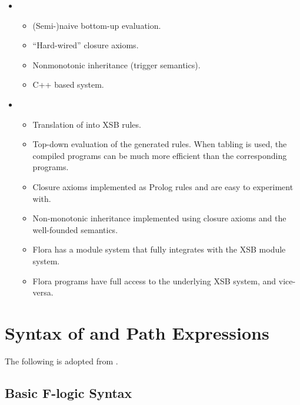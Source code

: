 \documentclass[11pt]{report}
\begin{document}
\begin{itemize}
\item \FLORID
  \begin{itemize}
  \item (Semi-)naive bottom-up evaluation.
  \item ``Hard-wired'' closure axioms.
  \item Nonmonotonic inheritance (trigger semantics).
  \item C++ based system.
  \end{itemize}
\item \FLORA
  \begin{itemize}
  \item Translation of \fl into XSB rules.
  \item Top-down evaluation of the generated rules. When tabling is used,
    the compiled programs can be much more efficient than the corresponding
    \FLORID programs.
  \item Closure axioms implemented as Prolog rules and are easy to
    experiment with.
  \item Non-monotonic inheritance implemented using closure axioms and the
    well-founded semantics.
  \item Flora has a module system that fully integrates with the XSB module
    system.
  \item Flora programs have full access to the underlying XSB system, and
    vice-versa.
  \end{itemize}
\end{itemize}



\section{Syntax of \FLORA and Path Expressions }

The following is adopted from \cite{ludaescher-himmeroeder-IS-98}.


\subsection{Basic F-logic Syntax}\label{sec-basic-flogic}
\end{document}
